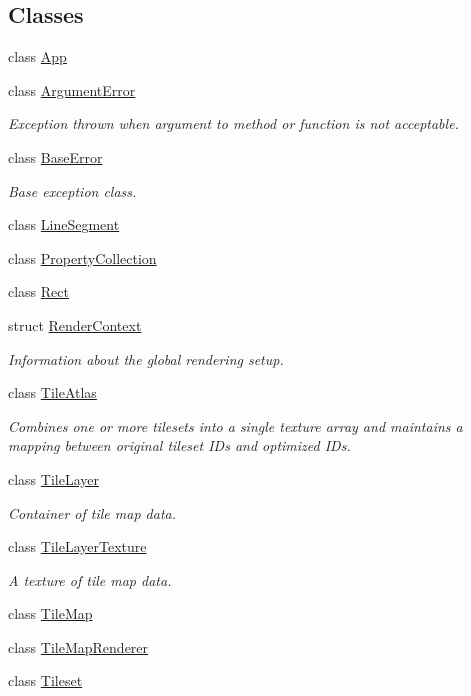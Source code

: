 \subsection*{Classes}
\begin{DoxyCompactItemize}
\item 
class \hyperlink{classpixel_1_1_app}{App}
\item 
class \hyperlink{classpixel_1_1_argument_error}{Argument\+Error}
\begin{DoxyCompactList}\small\item\em Exception thrown when argument to method or function is not acceptable. \end{DoxyCompactList}\item 
class \hyperlink{classpixel_1_1_base_error}{Base\+Error}
\begin{DoxyCompactList}\small\item\em Base exception class. \end{DoxyCompactList}\item 
class \hyperlink{classpixel_1_1_line_segment}{Line\+Segment}
\item 
class \hyperlink{classpixel_1_1_property_collection}{Property\+Collection}
\item 
class \hyperlink{classpixel_1_1_rect}{Rect}
\item 
struct \hyperlink{structpixel_1_1_render_context}{Render\+Context}
\begin{DoxyCompactList}\small\item\em Information about the global rendering setup. \end{DoxyCompactList}\item 
class \hyperlink{classpixel_1_1_tile_atlas}{Tile\+Atlas}
\begin{DoxyCompactList}\small\item\em Combines one or more tilesets into a single texture array and maintains a mapping between original tileset I\+Ds and optimized I\+Ds. \end{DoxyCompactList}\item 
class \hyperlink{classpixel_1_1_tile_layer}{Tile\+Layer}
\begin{DoxyCompactList}\small\item\em Container of tile map data. \end{DoxyCompactList}\item 
class \hyperlink{classpixel_1_1_tile_layer_texture}{Tile\+Layer\+Texture}
\begin{DoxyCompactList}\small\item\em A texture of tile map data. \end{DoxyCompactList}\item 
class \hyperlink{classpixel_1_1_tile_map}{Tile\+Map}
\item 
class \hyperlink{classpixel_1_1_tile_map_renderer}{Tile\+Map\+Renderer}
\item 
class \hyperlink{classpixel_1_1_tileset}{Tileset}
\end{DoxyCompactItemize}
